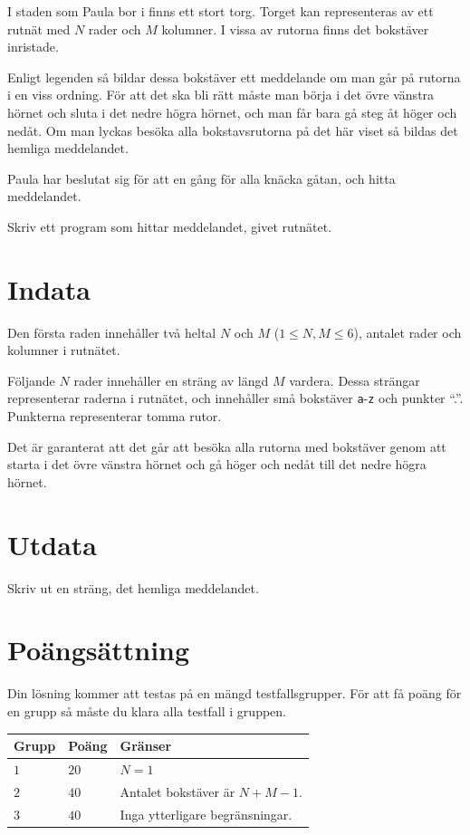 \noindent
I staden som Paula bor i finns ett stort torg. Torget kan representeras av ett 
rutnät med $N$ rader och $M$ kolumner. I vissa av rutorna finns det bokstäver 
inristade. 

Enligt legenden så bildar dessa bokstäver ett meddelande om man 
går på rutorna i en viss ordning. För att det ska bli rätt måste man börja 
i det övre vänstra hörnet och sluta i det nedre högra hörnet, och man får bara gå steg åt höger 
och nedåt. Om man lyckas besöka alla bokstavsrutorna på det här viset så bildas 
det hemliga meddelandet. 

Paula har beslutat sig för att en gång för alla knäcka gåtan, och hitta meddelandet.

Skriv ett program som hittar meddelandet, givet rutnätet.

\section*{Indata}
Den första raden innehåller två heltal $N$ och $M$ ($1 \leq N,M \leq 6$), 
antalet rader och kolumner i rutnätet.

Följande $N$ rader innehåller en sträng av längd $M$ vardera. Dessa strängar 
representerar raderna i rutnätet, och innehåller små bokstäver \texttt{a}-\texttt{z} och punkter ``.''.
Punkterna representerar tomma rutor.

Det är garanterat att det går att besöka alla rutorna med bokstäver genom att 
starta i det övre vänstra hörnet och gå höger och nedåt till det nedre högra hörnet.

\section*{Utdata}
Skriv ut en sträng, det hemliga meddelandet.

\section*{Poängsättning}
Din lösning kommer att testas på en mängd testfallsgrupper.
För att få poäng för en grupp så måste du klara alla testfall i gruppen.

\noindent
\begin{tabular}{| l | l | p{12cm} |}
  \hline
  \textbf{Grupp} & \textbf{Poäng} & \textbf{Gränser} \\ \hline
  $1$    & $20$       & $N = 1$ \\ \hline
  $2$    & $40$       & Antalet bokstäver är $N+M-1$. \\ \hline
  $3$    & $40$       & Inga ytterligare begränsningar. \\ \hline
\end{tabular}

